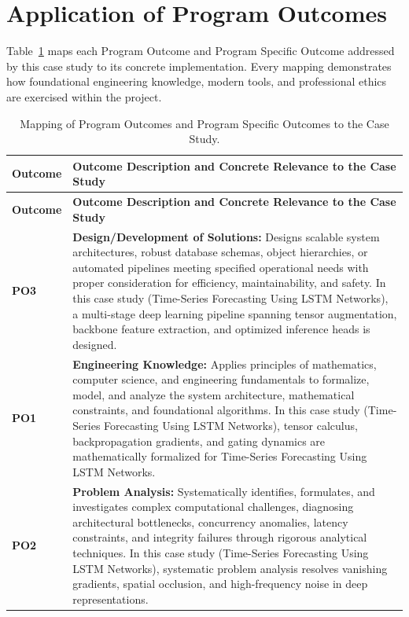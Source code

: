 \section{Application of Program Outcomes}
Table~\ref{tab:po} maps each Program Outcome and Program Specific Outcome addressed by this case study to its concrete implementation. Every mapping demonstrates how foundational engineering knowledge, modern tools, and professional ethics are exercised within the project.

{\small
\begin{longtable}{@{}>{\centering\arraybackslash}p{1.8cm} p{13.2cm}@{}}
    \caption{Mapping of Program Outcomes and Program Specific Outcomes to the Case Study.}\label{tab:po}\\
    \toprule
    \textbf{Outcome} & \textbf{Outcome Description and Concrete Relevance to the Case Study} \\
    \midrule
    \endfirsthead
    \toprule
    \textbf{Outcome} & \textbf{Outcome Description and Concrete Relevance to the Case Study} \\
    \midrule
    \endhead
\textbf{PO3} & \textbf{Design/Development of Solutions:} Designs scalable system architectures, robust database schemas, object hierarchies, or automated pipelines meeting specified operational needs with proper consideration for efficiency, maintainability, and safety. In this case study (Time-Series Forecasting Using LSTM Networks), a multi-stage deep learning pipeline spanning tensor augmentation, backbone feature extraction, and optimized inference heads is designed. \\
    \addlinespace
\textbf{PO1} & \textbf{Engineering Knowledge:} Applies principles of mathematics, computer science, and engineering fundamentals to formalize, model, and analyze the system architecture, mathematical constraints, and foundational algorithms. In this case study (Time-Series Forecasting Using LSTM Networks), tensor calculus, backpropagation gradients, and gating dynamics are mathematically formalized for Time-Series Forecasting Using LSTM Networks. \\
    \addlinespace
\textbf{PO2} & \textbf{Problem Analysis:} Systematically identifies, formulates, and investigates complex computational challenges, diagnosing architectural bottlenecks, concurrency anomalies, latency constraints, and integrity failures through rigorous analytical techniques. In this case study (Time-Series Forecasting Using LSTM Networks), systematic problem analysis resolves vanishing gradients, spatial occlusion, and high-frequency noise in deep representations. \\

\end{longtable}}
